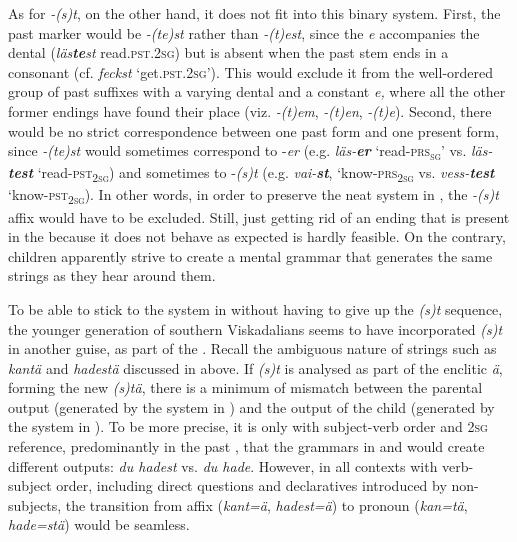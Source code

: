 \documentclass[output=paper,colorlinks,citecolor=brown,draft,draftmode]{langscibook}
\begin{document}
As for \textit{-(s)t}, on the other hand, it does not fit into this binary system. First, the past  marker would be \textit{-(te)st} rather than \textit{-(t)est}, since the \textit{e} accompanies the dental (\textit{läs\textbf{{te}}\textit{st}} read.\textsc{pst}.2\textsc{sg}) but is absent when the past  stem ends in a consonant (cf. \textit{feckst} ‘get.\textsc{pst}.2\textsc{sg}’). This would exclude it from the well-ordered group of past  suffixes with a varying dental and a constant \textit{e,} where all the other former  endings have found their place (viz. \textit{\nobreakdash-(t)em}, \textit{-(t)en}, \textit{-(t)e}). Second, there would be no strict correspondence between one past  form and one present  form, since \textit{-(te)st} would sometimes correspond to -\textit{er} (e.g. \textit{läs-\textbf{{er}}} ‘read-\textsc{prs}\textsc{\textsubscript{sg}}’ vs. \textit{läs-\textbf{{test}}} ‘read-\textsc{pst}\textsubscript{2}\textsc{\textsubscript{sg}}) and sometimes to -\textit{(s)t} (e.g. \textit{vai-\textbf{{st}}}, ‘know-\textsc{prs}\textsubscript{2}\textsc{\textsubscript{sg}} vs. \textit{vess\nobreakdash-\textbf{{test}}} ‘know-\textsc{pst}\textsubscript{2}\textsc{\textsubscript{sg}}). In other words, in order to preserve the neat system in , the \textit{-(s)t} affix would have to be excluded. Still, just getting rid of an ending that is present in the  because it does not behave as expected is hardly feasible. On the contrary, children apparently strive to create a mental grammar that generates the same strings as they hear around them.



To be able to stick to the system in  without having to give up the \textit{(s)t} sequence, the younger generation of southern Viskadalians seems to have incorporated \textit{(s)t} in another guise, as part of the . Recall the ambiguous nature of strings such as \textit{kantä} and \textit{hadestä} discussed in  above. If \textit{(s)t} is analysed as part of the enclitic \textit{ä}, forming the new  \textit{(s)tä}, there is a minimum of mismatch between the parental output (generated by the system in ) and the output of the child (generated by the system in ). To be more precise, it is only with subject-verb order and 2\textsc{sg} reference, predominantly in the past , that the grammars in  and  would create different outputs: \textit{du hadest} vs. \textit{du hade}. However, in all contexts with verb-subject order, including direct questions and declaratives introduced by non-subjects, the transition from affix (\textit{kant=ä}, \textit{hadest=ä}) to pronoun (\textit{kan=tä}, \textit{hade=stä}) would be seamless.
\end{document}
